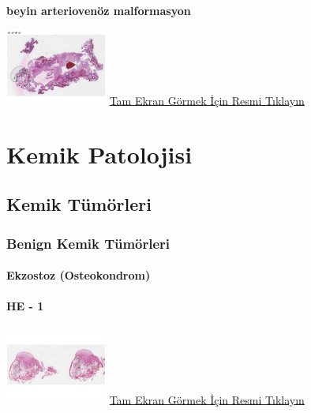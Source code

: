 \documentclass[
  letterpaper,
  DIV=11,
  numbers=noendperiod]{scrreprt}
\begin{document}
\textbf{beyin arteriovenöz malformasyon}

\href{https://images.patolojiatlasi.com/brain-arteriovenous-malformation/HE.html}{\includegraphics[width=0.25\textwidth,height=\textheight]{./screenshots/thumbnail_brain-arteriovenous-malformation.png}}
\href{https://images.patolojiatlasi.com/brain-arteriovenous-malformation/HE.html}{Tam
Ekran Görmek İçin Resmi Tıklayın}

\part{Kemik Patolojisi}

\hypertarget{sec-kemik-tumorleri}{%
\chapter{Kemik Tümörleri}\label{sec-kemik-tumorleri}}

\hypertarget{sec-benign-kemik-tumorleri}{%
\section{Benign Kemik Tümörleri}\label{sec-benign-kemik-tumorleri}}

\hypertarget{sec-ekzostoz}{%
\subsection{Ekzostoz (Osteokondrom)}\label{sec-ekzostoz}}

\hypertarget{he---1-4}{%
\subsection{HE - 1}\label{he---1-4}}

\href{https://images.patolojiatlasi.com/exostosis/oc.html}{\includegraphics[width=0.25\textwidth,height=\textheight]{./screenshots/thumbnail_exostosis-1.png}}
\href{https://images.patolojiatlasi.com/exostosis/oc.html}{Tam Ekran
Görmek İçin Resmi Tıklayın}
\end{document}
